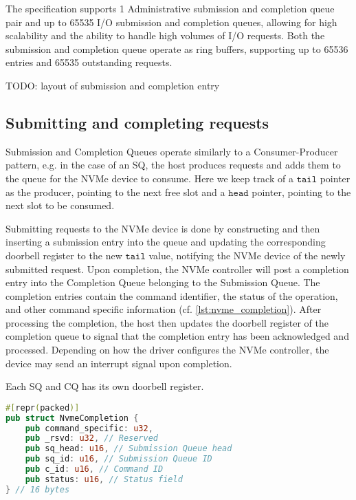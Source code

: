 The specification supports 1 Administrative submission and completion queue pair and up to 65535 I/O submission and completion queues, allowing for high scalability and the ability to handle high volumes of I/O requests. Both the submission and completion queue operate as ring buffers, supporting up to 65536 entries and 65535 outstanding requests.

TODO: layout of submission and completion entry

\subsection{Submitting and completing requests}
Submission and Completion Queues operate similarly to a Consumer-Producer pattern, e.g. in the case of an SQ, the host produces requests and adds them to the queue for the NVMe device to consume. Here we keep track of a $\texttt{tail}$ pointer as the producer, pointing to the next free slot and a $\texttt{head}$ pointer, pointing to the next slot to be consumed.

Submitting requests to the NVMe device is done by constructing and then inserting a submission entry into the queue and updating the corresponding doorbell register to the new $\texttt{tail}$ value, notifying the NVMe device of the newly submitted request. Upon completion, the NVMe controller will post a completion entry into the Completion Queue belonging to the Submission Queue. The completion entries contain the command identifier, the status of the operation, and other command specific information (cf. \ref{lst:nvme_completion}). After processing the completion, the host then updates the doorbell register of the completion queue to signal that the completion entry has been acknowledged and processed. Depending on how the driver configures the NVMe controller, the device may send an interrupt signal upon completion.

Each SQ and CQ has its own doorbell register.



\begin{lstlisting}[float,language=Rust,label=lst:nvme_completion,caption=NVMe completion entry defined as a struct in Rust]
#[repr(packed)]
pub struct NvmeCompletion {
    pub command_specific: u32,
    pub _rsvd: u32, // Reserved
    pub sq_head: u16, // Submission Queue head
    pub sq_id: u16, // Submission Queue ID
    pub c_id: u16, // Command ID
    pub status: u16, // Status field
} // 16 bytes
\end{lstlisting}

